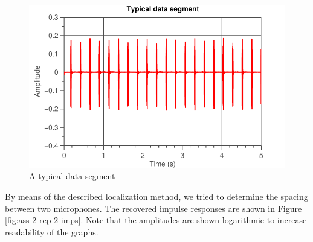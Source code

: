 \documentclass[11pt,titlepage]{report}
\begin{document}
\begin{figure}[H]
	\begin{center}
		\includegraphics[width=.6\linewidth]{../../deliverable-7-resources/figures/ass-2/report-2-3/ass-2-report-2-typical-data-segment.pdf}
	\end{center}
	\caption{A typical data segment}
	\label{fig:ass-2-rep-2-typical}
\end{figure}

By means of the described localization method, we tried to determine the spacing between two microphones. The recovered impulse responses are shown in Figure \ref{fig:ass-2-rep-2-imps}. Note that the amplitudes are shown logarithmic to increase readability of the graphs.
\end{document}
